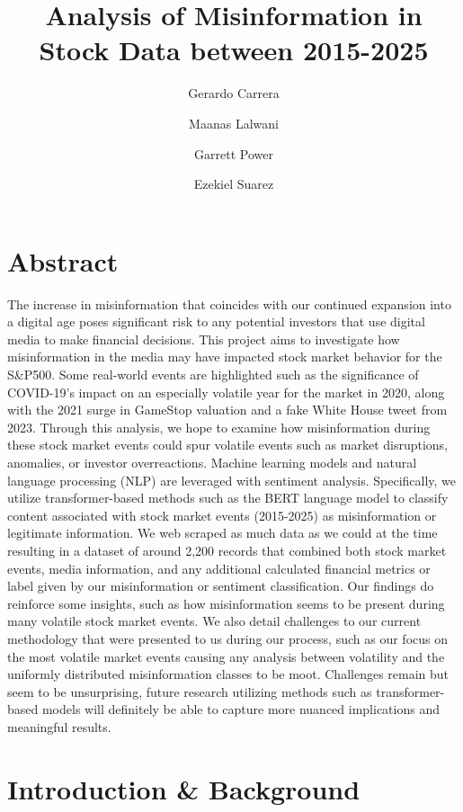 \documentclass{article}
\title{Analysis of Misinformation in Stock Data between 2015-2025}
\author{Gerardo Carrera}
\author{Maanas Lalwani}
\author{Garrett Power}
\author{Ezekiel Suarez}
\affil{Arizona State University, Tempe, AZ 85281, USA}
\begin{document}
\maketitle
\setlength{\parindent}{0cm}

\section{Abstract}

The increase in misinformation that coincides with our continued expansion into a digital age poses significant risk to any potential investors that use digital media to make financial decisions. This project aims to investigate how misinformation in the media may have impacted stock market behavior for the S\&P500. Some real-world events are highlighted such as the significance of COVID-19’s impact on an especially volatile year for the market in 2020, along with the 2021 surge in GameStop valuation and a fake White House tweet from 2023. Through this analysis, we hope to examine how misinformation during these stock market events could spur volatile events such as market disruptions, anomalies, or investor overreactions. Machine learning models and natural language processing (NLP) are leveraged with sentiment analysis. Specifically, we utilize transformer-based methods such as the BERT language model to classify content associated with stock market events (2015-2025) as misinformation or legitimate information. We web scraped as much data as we could at the time resulting in a dataset of around 2,200 records that combined both stock market events, media information, and any additional calculated financial metrics or label given by our misinformation or sentiment classification. Our findings do reinforce some insights, such as how misinformation seems to be present during many volatile stock market events. We also detail challenges to our current methodology that were presented to us during our process, such as our focus on the most volatile market events causing any analysis between volatility and the uniformly distributed misinformation classes to be moot. Challenges remain but seem to be unsurprising, future research utilizing methods such as transformer-based models will definitely be able to capture more nuanced implications and meaningful results.

\section{Introduction \& Background}
\end{document}
